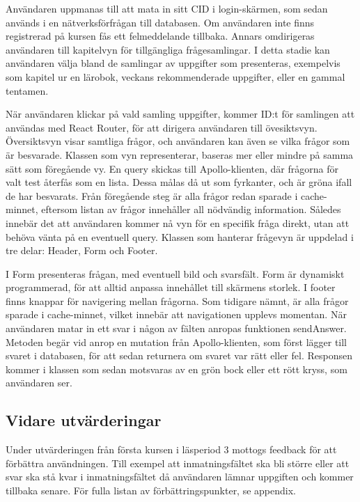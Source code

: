 Användaren uppmanas till att mata in sitt CID i login-skärmen, som sedan används i en nätverksförfrågan till databasen. Om användaren inte finns registrerad på kursen fås ett felmeddelande tillbaka. Annars omdirigeras användaren till kapitelvyn för tillgängliga frågesamlingar. I detta stadie kan användaren välja bland de samlingar av uppgifter som presenteras, exempelvis som kapitel ur en lärobok, veckans rekommenderade uppgifter, eller en gammal tentamen. 

När användaren klickar på vald samling uppgifter, kommer ID:t för samlingen att användas med React Router, för att dirigera användaren till övesiktsvyn. Översiktsvyn visar samtliga frågor, och användaren kan även se vilka frågor som är besvarade. Klassen som vyn representerar, baseras mer eller mindre på samma sätt som föregående vy. En query skickas till Apollo-klienten, där frågorna för valt test återfås som en lista. Dessa målas då ut som fyrkanter, och är gröna ifall de har besvarats. Från föregående steg är alla frågor redan sparade i cache-minnet, eftersom listan av frågor innehåller all nödvändig information. Således innebär det att användaren kommer nå vyn för en specifik fråga direkt, utan att behöva vänta på en eventuell query. Klassen som hanterar frågevyn är uppdelad i tre delar: Header, Form och Footer. 

I Form presenteras frågan, med eventuell bild och svarsfält. Form är dynamiskt programmerad, för att alltid anpassa innehållet till skärmens storlek. I footer finns knappar för navigering mellan frågorna. Som tidigare nämnt, är alla frågor sparade i cache-minnet, vilket innebär att navigationen upplevs momentan. När användaren matar in ett svar i någon av fälten anropas funktionen sendAnswer. Metoden begär vid anrop en mutation från Apollo-klienten, som först lägger till svaret i databasen, för att sedan returnera om svaret var rätt eller fel. Responsen kommer i klassen som sedan motsvaras av en grön bock eller ett rött kryss, som användaren ser. 

\subsection{Vidare utvärderingar}


Under utvärderingen från första kursen i läsperiod 3 mottogs feedback för att förbättra användningen. Till exempel att inmatningsfältet ska bli större eller att svar ska stå kvar i inmatningsfältet då användaren lämnar uppgiften och kommer tillbaka senare. För fulla listan av förbättringspunkter, se appendix. 

